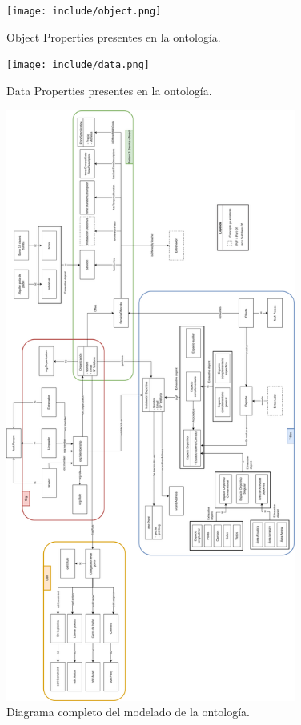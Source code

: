 \documentclass[a4paper,12pt]{article}
\begin{document}
	\begin{figure}[H]
		\centering
		\texttt{[image: include/object.png]}
		\caption{Object Properties presentes en la ontología.}
	\end{figure}
	
	\begin{figure}[H]
		\centering
		\texttt{[image: include/data.png]}
		\caption{Data Properties presentes en la ontología.}
	\end{figure}
	
		\begin{figure}[H]
		\centering
		\includegraphics[width=0.85\textwidth]{include/diagrama_modelo_completo.png}
		\caption{Diagrama completo del modelado de la ontología.}
	\end{figure}
	
\end{document}
